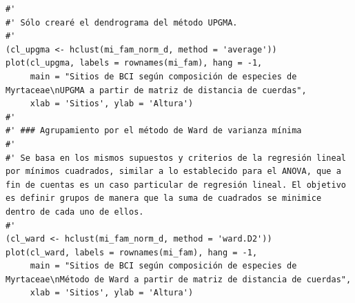 \documentclass[11pt,]{article}
\begin{document}
\begin{verbatim}
#' 
#' Sólo crearé el dendrograma del método UPGMA.
#' 
(cl_upgma <- hclust(mi_fam_norm_d, method = 'average'))
plot(cl_upgma, labels = rownames(mi_fam), hang = -1,
     main = "Sitios de BCI según composición de especies de Myrtaceae\nUPGMA a partir de matriz de distancia de cuerdas",
     xlab = 'Sitios', ylab = 'Altura')
#' 
#' ### Agrupamiento por el método de Ward de varianza mínima
#' 
#' Se basa en los mismos supuestos y criterios de la regresión lineal por mínimos cuadrados, similar a lo establecido para el ANOVA, que a fin de cuentas es un caso particular de regresión lineal. El objetivo es definir grupos de manera que la suma de cuadrados se minimice dentro de cada uno de ellos.
#' 
(cl_ward <- hclust(mi_fam_norm_d, method = 'ward.D2'))
plot(cl_ward, labels = rownames(mi_fam), hang = -1,
     main = "Sitios de BCI según composición de especies de Myrtaceae\nMétodo de Ward a partir de matriz de distancia de cuerdas",
     xlab = 'Sitios', ylab = 'Altura')
\end{verbatim}
\end{document}
